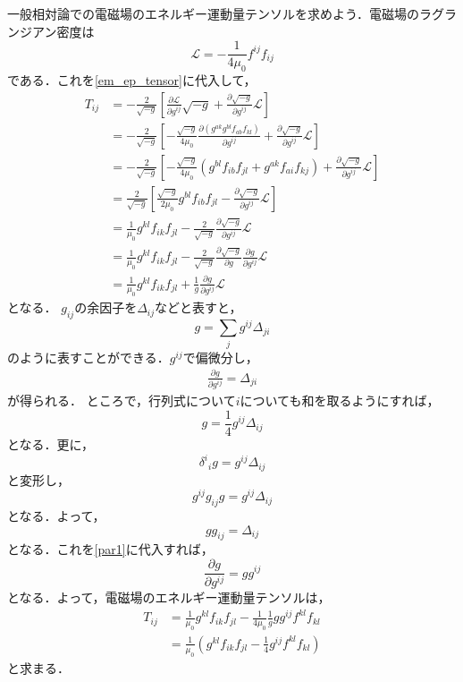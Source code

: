 \documentclass[a4paper]{ltjsreport}
\begin{document}
一般相対論での電磁場のエネルギー運動量テンソルを求めよう．電磁場のラグランジアン密度は
\[\mathcal{L}= - \frac{1}{4\mu_0}f^{ij}f_{ij}\]
である．これを\eqref{em_ep_tensor}に代入して，
\begin{align*}
  T_{ij} &=  - \frac{2}{\sqrt{ - g}}\left[\frac{\partial\mathcal{L}}{\partial{g^{ij}}}\sqrt{ - g} + \frac{\partial{\sqrt{ - g}}}{\partial{g^{ij}}}\mathcal{L}\right]\\
  &=  - \frac{2}{\sqrt{ - g}}\left[ - \frac{\sqrt{ - g}}{4\mu_0}\frac{\partial\left(g^{ak}g^{bl}f_{ab}f_{kl}\right)}{\partial{g^{ij}}} + \frac{\partial{\sqrt{ - g}}}{\partial{g^{ij}}}\mathcal{L}\right]\\
  &=  - \frac{2}{\sqrt{ - g}}\left[ - \frac{\sqrt{ - g}}{4\mu_0}\left(g^{bl}f_{ib}f_{jl} + g^{ak}f_{ai}f_{kj}\right) + \frac{\partial{\sqrt{ - g}}}{\partial{g^{ij}}}\mathcal{L}\right]\\
  &= \frac{2}{\sqrt{ - g}}\left[\frac{\sqrt{ - g}}{2\mu_0}g^{bl}f_{ib}f_{jl} - \frac{\partial{\sqrt{ - g}}}{\partial{g^{ij}}}\mathcal{L}\right]\\
  &= \frac{1}{\mu_0}g^{kl}f_{ik}f_{jl} - \frac{2}{\sqrt{ - g}}\frac{\partial{\sqrt{ - g}}}{\partial{g^{ij}}}\mathcal{L}\\
  &= \frac{1}{\mu_0}g^{kl}f_{ik}f_{jl} - \frac{2}{\sqrt{ - g}}\frac{\partial\sqrt{ - g}}{\partial{g}}\frac{\partial{g}}{\partial{g^{ij}}}\mathcal{L}\\
  &= \frac{1}{\mu_0}g^{kl}f_{ik}f_{jl} + \frac{1}{g}\frac{\partial{g}}{\partial{g^{ij}}}\mathcal{L}
\end{align*}
となる．
$g_{ij}$の余因子を$\Delta_{ij}$などと表すと，
\[g=\sum_jg^{ij}\Delta_{ji}\]
のように表すことができる．$g^{ij}$で偏微分し，
\begin{align}
  \frac{\partial{g}}{\partial{g^{ij}}}=\Delta_{ji}\label{par1}
\end{align}
が得られる．
ところで，行列式について$i$についても和を取るようにすれば，
\[g=\frac{1}{4}g^{ij}\Delta_{ij}\]
となる．更に，
\[{\delta^i}_ig=g^{ij}\Delta_{ij}\]
と変形し，
\[g^{ij}g_{ij}g=g^{ij}\Delta_{ij}\]
となる．よって，
\[gg_{ij}=\Delta_{ij}\]
となる．これを\eqref{par1}に代入すれば，
\[\frac{\partial{g}}{\partial{g^{ij}}}=gg^{ij}\]
となる．よって，電磁場のエネルギー運動量テンソルは，
\begin{align*}
  T_{ij} &= \frac{1}{\mu_0}g^{kl}f_{ik}f_{jl} - \frac{1}{4\mu_0}\frac{1}{g}gg^{ij}f^{kl}f_{kl}\\
  &= \frac{1}{\mu_0}\left(g^{kl}f_{ik}f_{jl} - \frac{1}{4}g^{ij}f^{kl}f_{kl}\right)
\end{align*}
と求まる．
\end{document}

